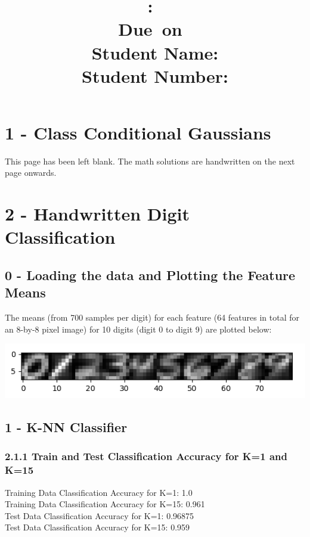\documentclass[10pt]{article}
\title{
    \vspace{2in}
    \textmd{\textbf{\hmwkClass:\ \hmwkTitle}}\\
    \vspace{0.1in}\small{Due\ on\ \hmwkDueDate}\\
    \vspace{3in}
    \vspace{0.1in}\large{Student Name: \textbf{\hmwkAuthorName} } \\
    \vspace{0.1in}\large{Student Number: \textbf{\hmwkAuthorNumber} } \\
}
\date{}
\begin{document}
\maketitle
\pagebreak

\begin{center} \tableofcontents \end{center}
\pagebreak

\clearpage
\setcounter{page}{1}

\section{1 - Class Conditional Gaussians}
This page has been left blank. The math solutions are handwritten on the next page onwards.



\section{2 - Handwritten Digit Classification}
\subsection{0 - Loading the data and Plotting the Feature Means}

The means (from 700 samples per digit) for each feature (64 features in total for an 8-by-8 pixel image) for 10 digits (digit 0 to digit 9) are plotted below: 

\begin{center}
\includegraphics[scale=1]{averages.png}
\end{center}


\subsection{1 -  K-NN Classifier}
\subsubsection{2.1.1 Train and Test Classification Accuracy for K=1 and K=15}

Training Data Classification Accuracy for K=1: 1.0
\\
Training Data Classification Accuracy for K=15: 0.961
\\
Test Data Classification Accuracy for K=1: 0.96875
\\
Test Data Classification Accuracy for K=15: 0.959
\end{document}
